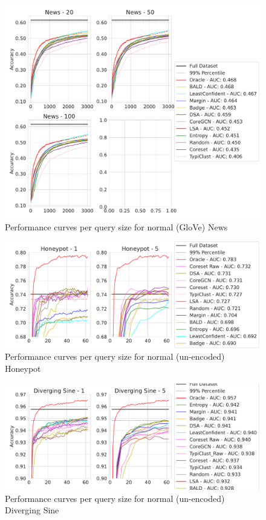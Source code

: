 \documentclass[]{article}
\begin{document}
\begin{figure}[H]
    \centering
    \caption{Performance curves per query size for normal (GloVe) News}
\includegraphics[width=\linewidth]{img/eval_news}
\end{figure}
\begin{figure}[H]
    \centering
    \caption{Performance curves per query size for normal (un-encoded) Honeypot}
\includegraphics[width=\linewidth]{img/eval_honeypot}
\end{figure}
\begin{figure}[H]
    \centering
    \caption{Performance curves per query size for normal (un-encoded) Diverging Sine}
\includegraphics[width=\linewidth]{img/eval_diverging_sine}
\end{figure}
\end{document}
